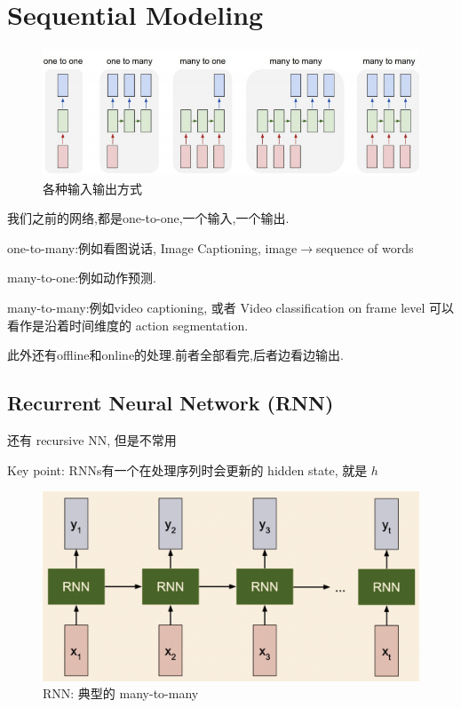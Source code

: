 \chapter{Sequential Modeling}

	\begin{figure}[htbp]
		\centering
		\includegraphics[scale=0.65]{figures/rnn-seqdata.png}
		\caption{各种输入输出方式}
	\end{figure}

	我们之前的网络,都是one-to-one,一个输入,一个输出.
	
	one-to-many:例如看图说话, Image Captioning, image$\rightarrow$sequence of words
	
	many-to-one:例如动作预测.
	
	many-to-many:例如video captioning, 或者 Video classification on frame level 可以看作是沿着时间维度的 action segmentation.

	此外还有offline和online的处理.前者全部看完,后者边看边输出.
	
	\section{Recurrent Neural Network (RNN)}
	
	还有 recursive NN, 但是不常用

	Key point: RNNs有一个在处理序列时会更新的 hidden state, 就是 $h$

	\begin{figure}[htbp]
		\centering
		\includegraphics[scale=0.3]{figures/rnn.png}
		\caption{RNN: 典型的 many-to-many}
	\end{figure}

